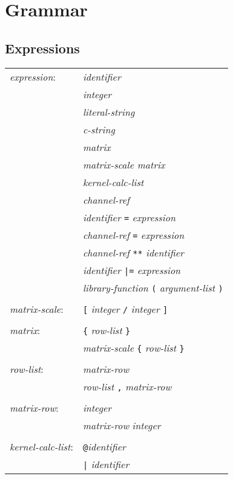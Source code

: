\section{Grammar}

\subsection{Expressions}

\begin{center}\begin{tabular}{l l}
\emph{expression}: & \emph{identifier}\\
& \emph{integer}\\
& \emph{literal-string}\\
& \emph{c-string}\\
& \emph{matrix}\\
& \emph{matrix-scale matrix}\\
& \emph{kernel-calc-list}\\
& \emph{channel-ref}\\
& \emph{identifier} \texttt{=} \emph{expression}\\
& \emph{channel-ref} \texttt{=} \emph{expression}\\
& \emph{channel-ref} \texttt{**} \emph{identifier}\\
& \emph{identifier} \texttt{|=} \emph{expression}\\
& \emph{library-function} \texttt{(} \emph{argument-list} \texttt{)}\\
\\
\emph{matrix-scale}: & \texttt{[} \emph{integer} \texttt{/} \emph{integer} \texttt{]}\\
\\
\emph{matrix}: & \texttt{\{} \emph{row-list} \texttt{\}}\\
& \emph{matrix-scale} \texttt{\{} \emph{row-list} \texttt{\}}\\
\\
\emph{row-list}: & \emph{matrix-row}\\
& \emph{row-list} \texttt{,} \emph{matrix-row}\\
\\
\emph{matrix-row}: & \emph{integer}\\
& \emph{matrix-row} \emph{integer}\\
\\
\emph{kernel-calc-list}: & \texttt{@}\emph{identifier}\\
& \texttt{|} \emph{identifier}\\

\end{tabular}
\end{center}
